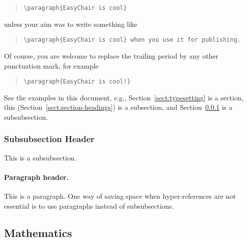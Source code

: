 \documentclass[withtimes]{easychair}
\begin{document}
\begin{quote}
\verb|\paragraph{EasyChair is cool}|
\end{quote}
unless your aim was to write something like

\begin{quote}
\verb|\paragraph{EasyChair is cool} when you use it for publishing.| 
\end{quote}
Of course, you are welcome to replace the trailing period by any other
punctuation mark, for example 

\begin{quote}
\verb|\paragraph{EasyChair is cool!}|
\end{quote}

See the examples in this document, e.g.,
Section~\ref{sect:typesetting} is a section, this 
(Section~\ref{sect:section-headings}) is a subsection, and
Section~\ref{sect:subsubsection-headings} is a subsubsection.

\subsubsection{Subsubsection Header}
\label{sect:subsubsection-headings}

This is a subsubsection. 

\paragraph{Paragraph header.}

This is a paragraph. 
One way of saving space when hyper-references are not essential is to 
use paragraphs instead of subsubsections.

\subsection{Mathematics}
\label{sect:mathematics}
\end{document}
